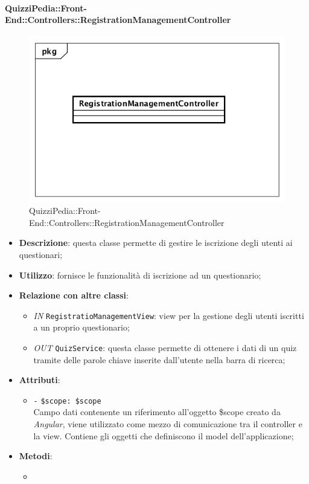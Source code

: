\paragraph{QuizziPedia::Front-End::Controllers::RegistrationManagementController}
\begin{figure}
	\centering
	\includegraphics[scale=0.45]{UML/Classi/Front-End/QuizziPedia_Front-end_Controller_RegistrationManagementController.png}
	\caption{QuizziPedia::Front-End::Controllers::RegistrationManagementController}
\end{figure}
\begin{itemize}
	\item \textbf{Descrizione}: questa classe permette di gestire le iscrizione degli utenti ai questionari;
	\item \textbf{Utilizzo}: fornisce le funzionalità di iscrizione ad un questionario;
	\item \textbf{Relazione con altre classi}:
	\begin{itemize}
		\item \textit{IN} \texttt{RegistratioManagementView}: view per la gestione degli utenti iscritti a un proprio questionario; 
		\item \textit{OUT} \texttt{QuizService}: questa classe permette di ottenere i dati di un quiz tramite delle parole chiave inserite dall'utente nella barra di ricerca;
	\end{itemize}
	\item \textbf{Attributi}:
	\begin{itemize}
		\item \texttt{-} \texttt{\$scope: \$scope} \\
		Campo dati contenente un riferimento all’oggetto \$scope creato da \textit{Angular}, viene utilizzato come mezzo di comunicazione tra il controller e la view. Contiene gli oggetti che definiscono il model dell’applicazione;
	\end{itemize}
	\item \textbf{Metodi}:
	\begin{itemize}
		\item 
	\end{itemize}
\end{itemize}

